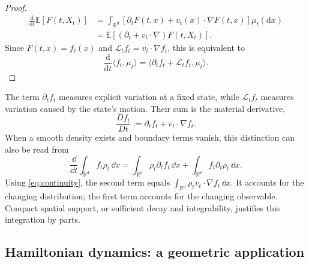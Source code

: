 \documentclass[12pt,a4paper,oneside]{book}
\begin{document}
\begin{proof}
\begin{equation*}
\begin{aligned}
    \frac{\mathrm d}{\mathrm dt}\mathbb E[F(t,X_t)]
    &=
    \int_{\mathbb R^d}
    \left[
        \partial_t F(t,x)
        +v_t(x)\cdot\nabla F(t,x)
    \right]\mu_t(\mathrm dx)\\
    &=
    \mathbb E\left[
        (\partial_t+v_t\cdot\nabla)F(t,X_t)
    \right].
\end{aligned}
\end{equation*}
Since $F(t,x)=f_t(x)$ and
$\mathcal L_t f_t=v_t\cdot\nabla f_t$, this is equivalent to
\begin{equation*}
    \frac{\mathrm d}{\mathrm dt}
    \langle f_t,\mu_t\rangle
    =
    \langle\partial_t f_t+\mathcal L_t f_t,\mu_t\rangle.
\end{equation*}
\end{proof}

The term $\partial_t f_t$ measures explicit variation at a fixed state, while $\mathcal L_t f_t$ measures variation
caused by the state's motion. Their sum is the material derivative,
\begin{equation*}
    \frac{D f_t}{Dt}:=\partial_t f_t+v_t\cdot\nabla f_t.
\end{equation*}
When a smooth density exists and boundary terms vanish, this distinction can also be read from
\begin{equation*}
    \frac{\dd}{\dd t}\int_{\mathbb R^d}f_t\rho_t\,\dd x
    =\int_{\mathbb R^d}\rho_t\partial_t f_t\,\dd x
    +\int_{\mathbb R^d}f_t\partial_t\rho_t\,\dd x.
\end{equation*}
Using \eqref{eq:continuity}, the second term equals
$\int_{\mathbb R^d}\rho_tv_t\cdot\nabla f_t\,\dd x$.
It accounts for the changing distribution; the first term accounts for the changing observable.
Compact spatial support, or sufficient decay and integrability, justifies this integration by parts.


\subsection{Hamiltonian dynamics: a geometric application}
\label{subsec:hamiltonian-application}\label{sec:hamiltonian-application}
\label{src:p10q1}
\end{document}
